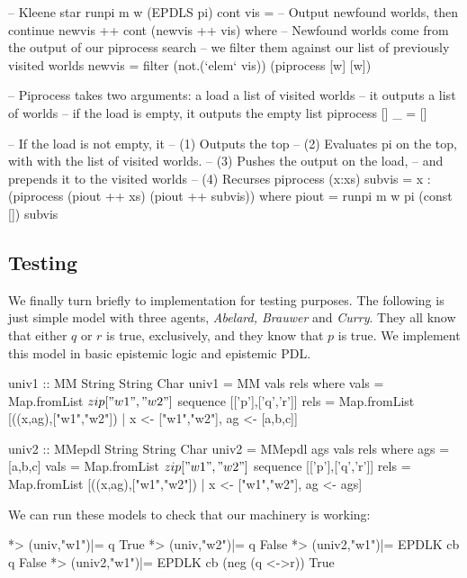 \documentclass[11pt]{article}
\theoremstyle{definition}
\begin{document}
\begin{code}
-- Kleene star
runpi m w (EPDLS pi) cont vis =
  -- Output newfound worlds, then continue
  newvis ++ cont (newvis ++ vis) 
    where
      -- Newfound worlds come from the output of our piprocess search
      -- we filter them against our list of previously visited worlds
      newvis = filter (not.(`elem` vis)) (piprocess [w] [w])

      -- Piprocess takes two arguments: a load a list of visited worlds
      -- it outputs a list of worlds
      -- if the load is empty, it outputs the empty list
      piprocess [] _ = []
      
      -- If the load is not empty, it 
      --  (1) Outputs the top
      --  (2) Evaluates pi on the top, with with the list of visited worlds.
      --  (3) Pushes the output on the load, 
      --      and prepends it to the visited worlds
      --  (4) Recurses
      piprocess (x:xs) subvis = x : (piprocess (piout ++ xs) (piout ++ subvis))
        where
          piout = runpi m w pi (const []) subvis
\end{code}

\subsection{Testing}

We finally turn briefly to implementation for testing purposes.  The following is just simple model with three agents, \emph{Abelard, Brauwer} and \emph{Curry}.  They all know that either $q$ or $r$ is true, exclusively, and they know that $p$ is true.  We implement this model in basic epistemic logic and epistemic PDL.

\begin{code}
univ1 :: MM String String Char
univ1 = MM vals rels
  where
  vals = Map.fromList $ zip ["w1","w2"] $ sequence [['p'],['q','r']]
  rels = Map.fromList [((x,ag),["w1","w2"]) | x <- ["w1","w2"], ag <- [a,b,c]]

univ2 :: MMepdl String String Char
univ2 = MMepdl ags vals rels
  where
  ags = [a,b,c]
  vals = Map.fromList $ zip ["w1","w2"] $ sequence [['p'],['q','r']]
  rels = Map.fromList [((x,ag),["w1","w2"]) | x <- ["w1","w2"], ag <- ags]
\end{code}

We can run these models to check that our machinery is working:

\begin{mycode}
*> (univ,"w1")|= q
True
*> (univ,"w2")|= q
False
*> (univ2,"w1")|= EPDLK cb q             
False
*> (univ2,"w1")|= EPDLK cb (neg (q <->r))
 True
\end{mycode}
\end{document}
